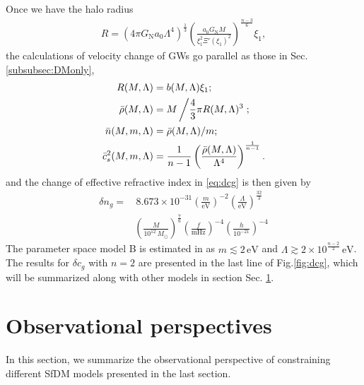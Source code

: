 \documentclass[aps,prd,twocolumn,10pt,groupedaddress]{revtex4-1}
\begin{document}
Once we have the halo radius
\begin{align}
R=(4\pi G_\mathrm{N}a_0\Lambda^4)^\frac13\left(\frac{a_0G_\mathrm{N}M}{\xi_1^2\Xi'(\xi_1)^2}\right)^\frac{n-3}{6}\xi_1,
\end{align}
the calculations of velocity change of GWs go parallel as those in Sec. \ref{subsubsec:DMonly},
\begin{align}
R(M,\Lambda)&=b(M,\Lambda)\xi_1;\\
\bar{\rho}(M,\Lambda)&=M\left/\frac43\pi R(M,\Lambda)^3\right.;\\
\bar{n}(M,m,\Lambda)&=\bar{\rho}(M,\Lambda)/m;\\
\bar{c}_s^2(M,m,\Lambda)&=\frac{1}{n-1}\left(\frac{\bar{\rho}(M,\Lambda)}{\Lambda^4}\right)^\frac{1}{n-1}.
\end{align}
and the change of effective refractive index in \eqref{eq:dcg} is then given by
\begin{align}
\delta n_g = &\,8.673\times10^{-31}\left(\frac{m}{\mathrm{eV}}\right)^{-2}
\left(\frac{\Lambda}{\mathrm{eV}}\right)^\frac{32}{3}\nonumber\\
&\left(\frac{M}{10^{12}\,M_\odot}\right)^\frac76\left(\frac{f}{\mathrm{mHz}}\right)^{-4}\left(\frac{h}{10^{-21}}\right)^{-4}
\end{align}
The parameter space model B is estimated in \cite{Khoury:2016ehj} as $m\lesssim2\,\mathrm{eV}$ and $\Lambda\gtrsim2\times10^\frac{n-2}{2}\,\mathrm{eV}$.  The results for $\delta c_g$ with $n=2$ are presented in the last line of Fig.\ref{fig:dcg}, which will be summarized along with other models in section Sec. \ref{sec:observation}.

\section{Observational perspectives} \label{sec:observation}

In this section, we summarize the observational perspective of constraining different SfDM models presented in the last section.
\end{document}

